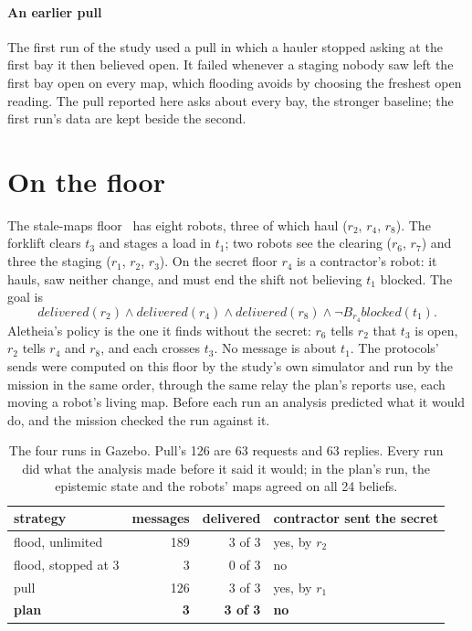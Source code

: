 \documentclass[11pt,a4paper]{article}
\theoremstyle{definition}
\newcommand{\Bop}[1]{B_{#1}}
\newcommand{\blocked}{\mathit{blocked}}
\newcommand{\delivered}{\mathit{delivered}}
\begin{document}
\paragraph{An earlier pull} The first run of the study used a pull in which a
hauler stopped asking at the first bay it then believed open. It failed whenever a
staging nobody saw left the first bay open on every map, which flooding avoids by
choosing the freshest open reading. The pull reported here asks about every bay, the
stronger baseline; the first run's data are kept beside the second.

\section{On the floor}
\label{sec:floor}

The stale-maps floor~\cite{ulises2026sm} has eight robots, three of which haul
($r_2$, $r_4$, $r_8$). The forklift clears $t_3$ and stages a load in $t_1$; two
robots see the clearing ($r_6$, $r_7$) and three the staging ($r_1$, $r_2$, $r_3$). On the secret floor $r_4$ is a
contractor's robot: it hauls, saw neither change, and must end the shift not
believing $t_1$ blocked. The goal is
\[
  \delivered(r_2) \wedge \delivered(r_4) \wedge \delivered(r_8) \wedge
  \neg\Bop{r_4}\blocked(t_1).
\]
Aletheia's policy is the one it finds without the secret: $r_6$ tells $r_2$ that
$t_3$ is open, $r_2$ tells $r_4$ and $r_8$, and each crosses $t_3$. No message is
about $t_1$. The protocols' sends were computed on this floor by the study's own
simulator and run by the mission in the same order, through the same relay the
plan's reports use, each moving a robot's living map. Before each run an analysis
predicted what it would do, and the mission checked the run against it.

\begin{table}[H]
\centering
\small
\begin{tabular}{@{}lrrl@{}}
\toprule
strategy & messages & delivered & contractor sent the secret \\
\midrule
flood, unlimited & 189 & 3 of 3 & yes, by $r_2$ \\
flood, stopped at 3 & 3 & 0 of 3 & no \\
pull & 126 & 3 of 3 & yes, by $r_1$ \\
\textbf{plan} & \textbf{3} & \textbf{3 of 3} & \textbf{no} \\
\bottomrule
\end{tabular}
\caption{The four runs in Gazebo. Pull's 126 are 63 requests and 63 replies. Every
run did what the analysis made before it said it would; in the plan's run, the
epistemic state and the robots' maps agreed on all 24 beliefs.}
\label{tab:floor}
\end{table}
\end{document}
